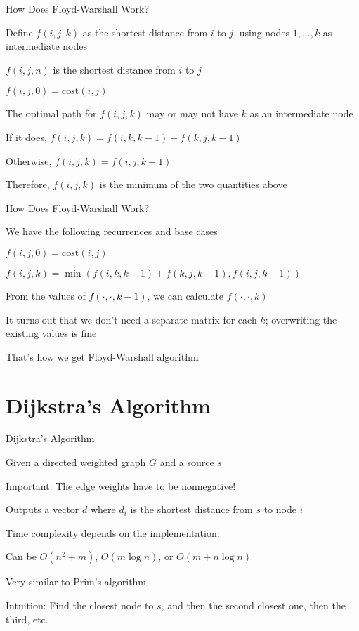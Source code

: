 \documentclass[13pt,onlymath]{beamer}
\begin{document}
\begin{frame}{How Does Floyd-Warshall Work?}
\BIT
\item Define $f(i, j, k)$ as the shortest distance from $i$ to $j$, using nodes $1, \ldots, k$ as intermediate nodes
\BIT
\item $f(i, j, n)$ is the shortest distance from $i$ to $j$
\item $f(i, j, 0) = \mathrm{cost}(i, j)$
\EIT
\item The optimal path for $f(i,j,k)$ may or may not have $k$ as an intermediate node
\BIT
\item If it does, $f(i,j,k) = f(i,k,k-1) + f(k,j,k-1)$
\item Otherwise, $f(i,j,k) = f(i,j,k-1)$
\EIT
\item Therefore, $f(i,j,k)$ is the minimum of the two quantities above
\EIT
\end{frame}

\begin{frame}{How Does Floyd-Warshall Work?}
\BIT
\item We have the following recurrences and base cases
\BIT
\item $f(i,j,0) = \mathrm{cost}(i,j)$
\item $f(i,j,k) = \min(f(i,k,k-1)+f(k,j,k-1), f(i,j,k-1))$
\EIT
\item From the values of $f(\cdot, \cdot, k-1)$, we can calculate $f(\cdot, \cdot, k)$
\BIT
\item It turns out that we don't need a separate matrix for each $k$; overwriting the existing values is fine
\EIT
\item That's how we get Floyd-Warshall algorithm
\EIT
\end{frame}

\section{Dijkstra's Algorithm}

\begin{frame}{Dijkstra's Algorithm}
\BIT
\item Given a directed weighted graph $G$ and a source $s$
\BIT
\item Important: The edge weights have to be nonnegative!
\EIT
\item Outputs a vector $d$ where $d_i$ is the shortest distance from $s$ to node $i$
\item Time complexity depends on the implementation:
\BIT
\item Can be $O(n^2 + m)$, $O(m \log n)$, or $O(m + n \log n)$
\EIT
\item Very similar to Prim's algorithm
\item Intuition: Find the closest node to $s$, and then the second closest one, then the third, etc.
\EIT
\end{frame}
\end{document}
